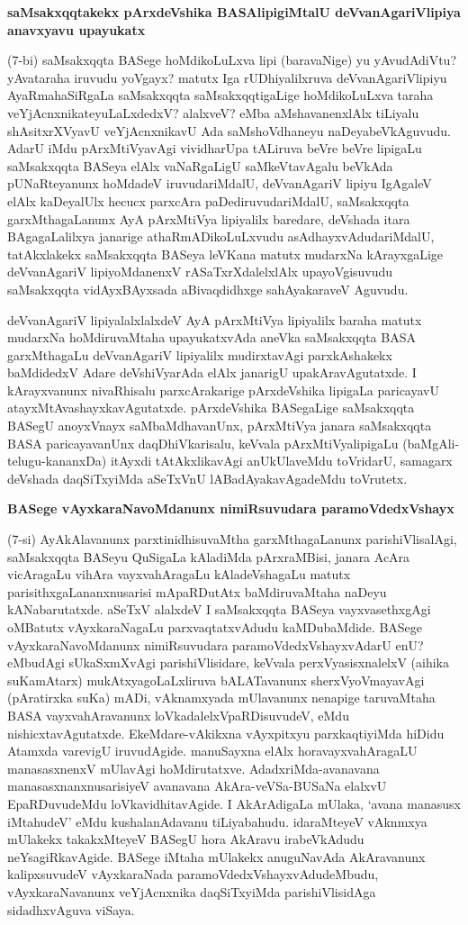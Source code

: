 \noindent
\textbf{saMsakxqqtakekx pArxdeVshika BASAlipigiMtalU deVvanAgariVlipiya anavxyavu upayukatx}

(7-bi) saMsakxqqta BASege hoMdikoLuLxva lipi (baravaNige) yu yAvudAdiVtu? yAvataraha iruvudu yoVgayx? matutx Iga rUDhiyalilxruva deVvanAgariVlipiyu AyaRmahaSiRgaLa saMsakxqqta saMsakxqqtigaLige hoMdikoLuLxva taraha veYjAcnxnikateyuLaLxdedxV? alalxveV? eMba aMshavanenxlAlx tiLiyalu shAsitxrXVyavU veYjAcnxnikavU Ada saMshoVdhaneyu naDeyabeVkAguvudu. AdarU iMdu pArxMtiVyavAgi vividharUpa tALiruva beVre beVre lipigaLu saMsakxqqta BASeya elAlx vaNaRgaLigU saMkeVtavAgalu beVkAda pUNaRteyanunx hoMdadeV iruvudariMdalU, deVvanAgariV lipiyu IgAgaleV elAlx kaDeyalUlx hecucx parxcAra paDediruvudariMdalU, saMsakxqqta garxMthagaLanunx AyA pArxMtiVya lipiyalilx baredare, deVshada itara BAgagaLalilxya janarige athaRmADikoLuLxvudu asAdhayxvAdudariMdalU, tatAkxlakekx saMsakxqqta
BASeya leVKana matutx mudarxNa kArayxgaLige deVvanAgariV lipiyoMdanenxV rASaTxrXdalelxlAlx upayoVgisuvudu saMsakxqqta vidAyxBAyxsada aBivaqdidhxge sahAyakaraveV Aguvudu. 

deVvanAgariV lipiyalalxlalxdeV AyA pArxMtiVya lipiyalilx baraha matutx mudarxNa hoMdiruvaMtaha upayukatxvAda aneVka saMsakxqqta BASA garxMthagaLu deVvanAgariV lipiyalilx mudirxtavAgi parxkAshakekx baMdidedxV Adare deVshiVyarAda elAlx janarigU upakAravAgutatxde. I kArayxvanunx nivaRhisalu parxcArakarige pArxdeVshika lipigaLa paricayavU atayxMtAvashayxkavAgutatxde. pArxdeVshika BASegaLige saMsakxqqta BASegU anoyxVnayx saMbaMdhavanUnx, pArxMtiVya janara saMsakxqqta BASA paricayavanUnx daqDhiVkarisalu, keVvala pArxMtiVyalipigaLu (baMgAli-telugu-kananxDa) itAyxdi tAtAkxlikavAgi anUkUlaveMdu toVridarU, sama\-garx deVshada daqSiTxyiMda aSeTxVnU lABadAyakavAgadeMdu toVrutetx.

\noindent
\textbf{BASege vAyxkaraNavoMdanunx nimiRsuvudara paramoVdedxVshayx}\label{page34}

(7-si) AyAkAlavanunx parxtinidhisuvaMtha garxMthagaLanunx parishiVlisalAgi, saMsakxqqta BASeyu QuSigaLa kAladiMda pArxraMBisi, janara AcAra vicAragaLu vihAra vayxvahAragaLu kAladeVshagaLu matutx parisithxgaLananxnusarisi mApaRDutAtx baMdiruvaMtaha naDeyu kANabarutatxde. aSeTxV alalxdeV I saMsakxqqta BASeya vayxvasethxgAgi oMBatutx vAyxkaraNagaLu parxvaqtatxvAdudu kaMDubaMdide. BASege vAyxkaraNavoMdanunx nimiRsuvudara paramoVdedxVshayxvAdarU enU? eMbudAgi 
sUkaSxmXvAgi parishiVlisidare, keVvala perxVyasisxnalelxV (aihika suKamAtarx) mukAtxyagoLaLxliruva bALATavanunx sherxVyoVmayavAgi (pAratirxka suKa) mADi, vAknamxyada mUlavanunx nenapige taruvaMtaha BASA vayxvahAravanunx loVkadalelxVpaRDisuvudeV, eMdu nishicxtavAgutatxde. EkeMdare-vAkikxna vAyxpitxyu parxkaqtiyiMda hiDidu Atamxda varevigU iruvudAgide. manuSayxna elAlx horavayxvahAragaLU manasasxnenxV mUlavAgi hoMdirutatxve. AdadxriMda-avanavana manasasxnanxnusarisiyeV avanavana AkAra-veVSa-BUSaNa elalxvU EpaRDuvudeMdu loVkavidhitavAgide. I AkArAdigaLa mUlaka, `avana manasusx iMtahudeV' eMdu kushalanAdavanu tiLiyabahudu. idaraMteyeV vAknmxya mUlakekx takakxMteyeV BASegU hora AkAravu irabeVkAdudu neYsagiRkavAgide. BASege iMtaha mUlakekx anuguNavAda AkAravanunx kalipxsuvudeV vAyxkaraNada paramoVdedxVshayxvAdudeMbudu, vAyxkaraNavanunx veYjAcnxnika daqSiTxyiMda parishiVlisidAga sidadhxvAguva viSaya.

